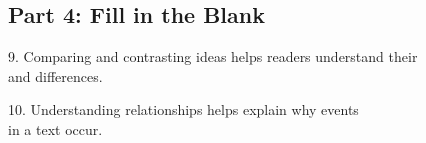 \documentclass[12pt]{article}
\begin{document}
\vspace{1cm}

\subsection*{Part 4: Fill in the Blank}
9. Comparing and contrasting ideas helps readers understand their\\ \underline{\hspace{4cm}} and differences.

\vspace{3cm}

10. Understanding \underline{\hspace{4cm}} relationships helps explain why events\\ in a text occur.

\vspace{3cm}








\end{document}
